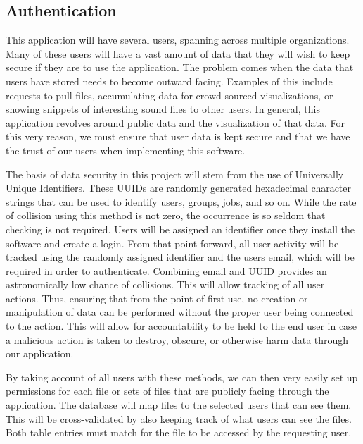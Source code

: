 \subsection{Authentication}
This application will have several users, spanning across multiple organizations. Many of these users will have a vast amount of data that they will wish to keep secure if they are to use the application. The problem comes when the data that users have stored needs to become outward facing. Examples of this include requests to pull files, accumulating data for crowd sourced visualizations, or showing snippets of interesting sound files to other users. In general, this application revolves around public data and the visualization of that data. For this very reason, we must ensure that user data is kept secure and that we have the trust of our users when implementing this software.\par
The basis of data security in this project will stem from the use of Universally Unique Identifiers. These UUID\textquotesingle s are randomly generated hexadecimal character strings that can be used to identify users, groups, jobs, and so on. While the rate of collision using this method is not zero, the occurrence is so seldom that checking is not required. Users will be assigned an identifier once they install the software and create a login. From that point forward, all user activity will be tracked using the randomly assigned identifier and the user\textquotesingle s email, which will be required in order to authenticate. Combining email and UUID provides an astronomically low chance of collisions. This will allow tracking of all user actions. Thus, ensuring that from the point of first use, no creation or manipulation of data can be performed without the proper user being connected to the action. This will allow for accountability to be held to the end user in case a malicious action is taken to destroy, obscure, or otherwise harm data through our application.\par
By taking account of all users with these methods, we can then very easily set up permissions for each file or sets of files that are publicly facing through the application. The database will map files to the selected users that can see them. This will be cross-validated by also keeping track of what users can see the files. Both table entries must match for the file to be accessed by the requesting user.
